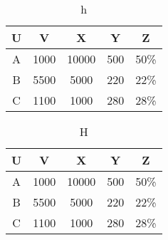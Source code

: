 \documentclass[type=bachelor]{bithesis}
\begin{document}
\frontmatter
\mainmatter

\begin{table}[h]
  \centering
  \caption{h}
  \begin{tabular}{ccccc}
    \toprule
    U    & V    & X    & Y   & Z    \\
    \midrule
    A    & 1000  & 10000 & 500  & 50\%  \\
    B   & 5500  & 5000  & 220  & 22\%  \\
    C & 1100  & 1000  & 280  & 28\%  \\ \bottomrule
    \end{tabular}
\end{table}

\clearpage

\begin{table}[H]
  \centering
  \caption{H}
  \begin{tabular}{ccccc}
    \toprule
    U    & V    & X    & Y   & Z    \\
    \midrule
    A    & 1000  & 10000 & 500  & 50\%  \\
    B   & 5500  & 5000  & 220  & 22\%  \\
    C & 1100  & 1000  & 280  & 28\%  \\ \bottomrule
    \end{tabular}
\end{table}
\end{document}
